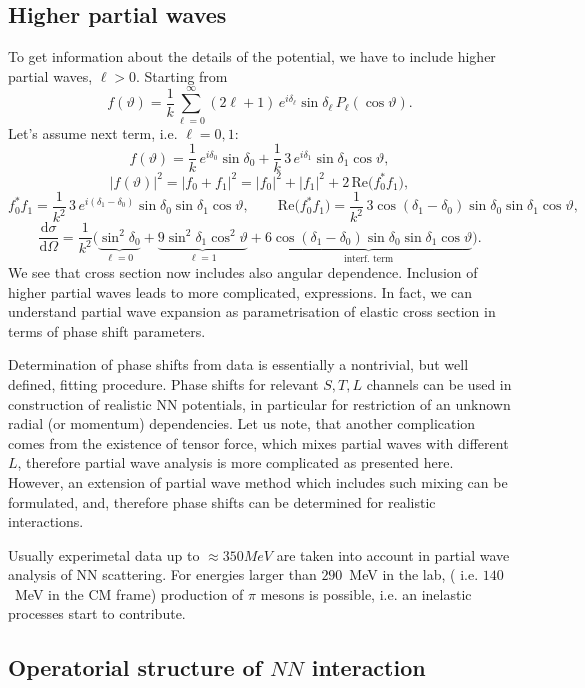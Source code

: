 \documentclass[11pt,a4paper]{article}
\newcommand{\ud}{\mathrm{d}}
\begin{document}
\subsection{Higher partial waves}

To get information about the details of the potential, we have to include
higher partial waves, $\ell>0$. Starting from
\[
f(\vartheta)=\frac1k\sum_{\ell=0}^{\infty}(2\ell+1)\,e^{i\delta_\ell}\sin\delta_\ell\,P_\ell(\cos\vartheta).
\]
Let's assume next term, i.e. $\ell=0,1$:
\[
f(\vartheta)=\frac1k\,e^{i\delta_0}\sin\delta_0+\frac1k\,3\,e^{i\delta_1}\sin\delta_1\cos\vartheta ,
\]
\[
|f(\vartheta)|^2=|f_0+f_1|^2=|f_0|^2+|f_1|^2+2\,\mathrm{Re}\big(f_0^*f_1\big),
\]
\[
f_0^*f_1=\frac{1}{k^2}\,3\,e^{i(\delta_1-\delta_0)}\sin\delta_0\sin\delta_1\cos\vartheta,
\qquad
\mathrm{Re}\big(f_0^*f_1\big)=\frac{1}{k^2}\,3\cos(\delta_1-\delta_0)\sin\delta_0\sin\delta_1\cos\vartheta,
\]
\[
\frac{\ud\sigma}{\ud\Omega}=\frac{1}{k^2}\Big(
\underbrace{\sin^2\delta_0}_{\ell=0}+\underbrace{9\sin^2\delta_1\cos^2\vartheta}_{\ell=1}
+\underbrace{6\cos(\delta_1-\delta_0)\sin\delta_0\sin\delta_1\cos\vartheta}_{\text{interf.\ term}}\Big).
\]
We see that cross section now includes also angular dependence. Inclusion of higher partial waves leads to more complicated, expressions. In fact, we can understand partial wave expansion as parametrisation of elastic cross section in terms of phase shift parameters. 

Determination of phase shifts from data is essentially a nontrivial, but well defined, fitting procedure. Phase shifts for relevant $S,T,L$ channels can be used in construction of realistic NN potentials, in particular for restriction of an unknown radial (or momentum) dependencies. Let us note, that another complication comes from the existence of tensor force, which mixes partial waves with different $L$, therefore partial wave analysis is more complicated as presented here. However, an extension of partial wave method which includes such mixing can be formulated, and, therefore phase shifts can be determined for realistic interactions.

Usually experimetal data up to $\approx 350 MeV$ are taken into account in partial wave analysis of NN scattering. For energies larger than $290$~MeV in the lab, ( i.e. $140$~MeV in the CM frame) production of $\pi$ mesons is possible, i.e. an inelastic processes start to contribute.  

\subsection{Operatorial structure of \texorpdfstring{$NN$}{NN} interaction}
\end{document}

